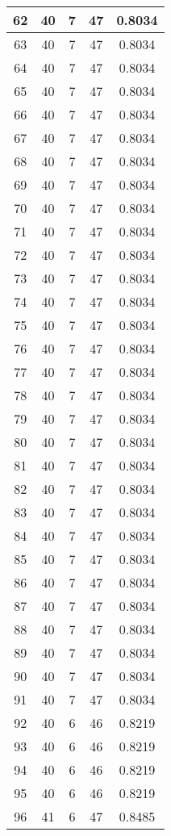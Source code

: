 \documentclass[letterpaper, 12pt]{article}
\begin{document}
\begin{longtable}{|c|c|c|c|c|}
\hline
62 & 40 & 7 & 47 & 0.8034 \\
\hline
63 & 40 & 7 & 47 & 0.8034 \\
\hline
64 & 40 & 7 & 47 & 0.8034 \\
\hline
65 & 40 & 7 & 47 & 0.8034 \\
\hline
66 & 40 & 7 & 47 & 0.8034 \\
\hline
67 & 40 & 7 & 47 & 0.8034 \\
\hline
68 & 40 & 7 & 47 & 0.8034 \\
\hline
69 & 40 & 7 & 47 & 0.8034 \\
\hline
70 & 40 & 7 & 47 & 0.8034 \\
\hline
71 & 40 & 7 & 47 & 0.8034 \\
\hline
72 & 40 & 7 & 47 & 0.8034 \\
\hline
73 & 40 & 7 & 47 & 0.8034 \\
\hline
74 & 40 & 7 & 47 & 0.8034 \\
\hline
75 & 40 & 7 & 47 & 0.8034 \\
\hline
76 & 40 & 7 & 47 & 0.8034 \\
\hline
77 & 40 & 7 & 47 & 0.8034 \\
\hline
78 & 40 & 7 & 47 & 0.8034 \\
\hline
79 & 40 & 7 & 47 & 0.8034 \\
\hline
80 & 40 & 7 & 47 & 0.8034 \\
\hline
81 & 40 & 7 & 47 & 0.8034 \\
\hline
82 & 40 & 7 & 47 & 0.8034 \\
\hline
83 & 40 & 7 & 47 & 0.8034 \\
\hline
84 & 40 & 7 & 47 & 0.8034 \\
\hline
85 & 40 & 7 & 47 & 0.8034 \\
\hline
86 & 40 & 7 & 47 & 0.8034 \\
\hline
87 & 40 & 7 & 47 & 0.8034 \\
\hline
88 & 40 & 7 & 47 & 0.8034 \\
\hline
89 & 40 & 7 & 47 & 0.8034 \\
\hline
90 & 40 & 7 & 47 & 0.8034 \\
\hline
91 & 40 & 7 & 47 & 0.8034 \\
\hline
92 & 40 & 6 & 46 & 0.8219 \\
\hline
93 & 40 & 6 & 46 & 0.8219 \\
\hline
94 & 40 & 6 & 46 & 0.8219 \\
\hline
95 & 40 & 6 & 46 & 0.8219 \\
\hline
96 & 41 & 6 & 47 & 0.8485 \\

\end{longtable}
\end{document}
